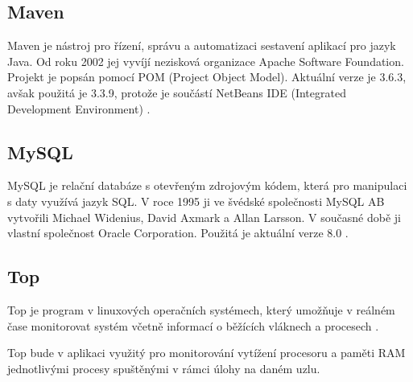 \subsection*{Maven}

Maven je nástroj pro řízení, správu a automatizaci sestavení aplikací pro jazyk Java. Od roku 2002 jej vyvíjí nezisková organizace Apache Software Foundation. Projekt je popsán pomocí POM (Project Object Model). Aktuální verze je 3.6.3, avšak použitá je 3.3.9, protože je součástí NetBeans IDE (Integrated Development Environment) \cite{Technology_Maven}.


\subsection*{MySQL}

MySQL je relační databáze s otevřeným zdrojovým kódem, která pro manipulaci s daty využívá jazyk SQL. V roce 1995 ji ve švédské společnosti MySQL AB vytvořili Michael Widenius, David Axmark a Allan Larsson. V současné době ji vlastní společnost Oracle Corporation. Použitá je aktuální verze 8.0 \cite{Technology_MySQL}.

\subsection*{Top}

Top je program v linuxových operačních systémech, který umožňuje v reálném čase monitorovat systém včetně informací o běžících vláknech a procesech \cite{Technology_Top}.

Top bude v aplikaci využitý pro monitorování vytížení procesoru a paměti RAM jednotlivými procesy spuštěnými v rámci úlohy na daném uzlu.


